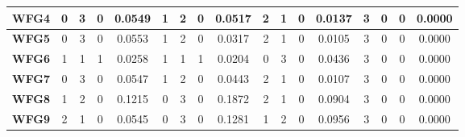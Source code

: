 \begin{table*}[t]
{\begin{tabular}{c|c|c|c|c|c|c|c|c|c|c|c|c|c|c|c|c|}
\multicolumn{1}{|c|}{\textbf{WFG4}}  & 0                   & 3                     & 0                          & 0.0549          & 1                   & 2                     & 0                          & 0.0517          & 2                   & 1                     & 0                          & 0.0137          & 3                   & 0                     & 0                          & 0.0000          \\ \hline
\multicolumn{1}{|c|}{\textbf{WFG5}}  & 0                   & 3                     & 0                          & 0.0553          & 1                   & 2                     & 0                          & 0.0317          & 2                   & 1                     & 0                          & 0.0105          & 3                   & 0                     & 0                          & 0.0000          \\ \hline
\multicolumn{1}{|c|}{\textbf{WFG6}}  & 1                   & 1                     & 1                          & 0.0258          & 1                   & 1                     & 1                          & 0.0204          & 0                   & 3                     & 0                          & 0.0436          & 3                   & 0                     & 0                          & 0.0000          \\ \hline
\multicolumn{1}{|c|}{\textbf{WFG7}}  & 0                   & 3                     & 0                          & 0.0547          & 1                   & 2                     & 0                          & 0.0443          & 2                   & 1                     & 0                          & 0.0107          & 3                   & 0                     & 0                          & 0.0000          \\ \hline
\multicolumn{1}{|c|}{\textbf{WFG8}}  & 1                   & 2                     & 0                          & 0.1215          & 0                   & 3                     & 0                          & 0.1872          & 2                   & 1                     & 0                          & 0.0904          & 3                   & 0                     & 0                          & 0.0000          \\ \hline
\multicolumn{1}{|c|}{\textbf{WFG9}}  & 2                   & 1                     & 0                          & 0.0545          & 0                   & 3                     & 0                          & 0.1281          & 1                   & 2                     & 0                          & 0.0956          & 3                   & 0                     & 0                          & 0.0000          \\ \hline

\end{tabular}}
\end{table*}
